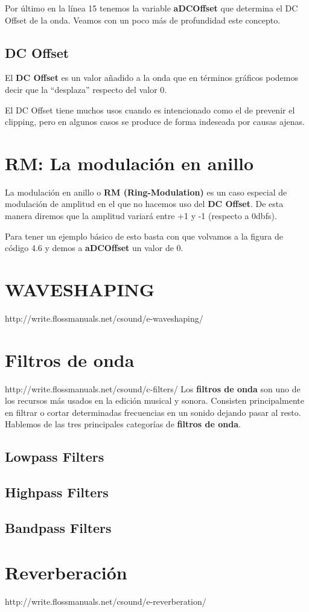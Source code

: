 Por último en la línea 15 tenemos la variable \textbf{aDCOffset} que determina el DC Offset de la onda. Veamos con un poco más de profundidad este concepto.

\subsection{DC Offset}
El \textbf{DC Offset} es un valor añadido a la onda que en términos gráficos podemos decir que la ``desplaza'' respecto del valor 0. 
 
El DC Offset tiene muchos usos cuando es intencionado como el de prevenir el clipping, pero en algunos casos se produce de forma indeseada por causas ajenas.
 
\section{RM: La modulación en anillo}

La modulación en anillo o \textbf{RM (Ring-Modulation)} es un caso especial de modulación de amplitud en el que no hacemos uso del \textbf{DC Offset}. De esta manera diremos que la amplitud variará entre +1 y -1 (respecto a 0dbfs).

Para tener un ejemplo básico de esto basta con que volvamos a la figura de código 4.6 y demos a \textbf{aDCOffset} un valor de 0.

\section{WAVESHAPING}
http://write.flossmanuals.net/csound/e-waveshaping/
\section{Filtros de onda}
http://write.flossmanuals.net/csound/c-filters/
Los \textbf{filtros de onda} son uno de los recursos más usados en la edición musical y sonora. Consisten principalmente en filtrar o cortar determinadas frecuencias en un sonido dejando pasar al resto. Hablemos de las tres principales categorías de \textbf{filtros de onda}.

\subsection{Lowpass Filters}

\subsection{Highpass Filters}

\subsection{Bandpass Filters}

\section{Reverberación}
http://write.flossmanuals.net/csound/e-reverberation/
 


